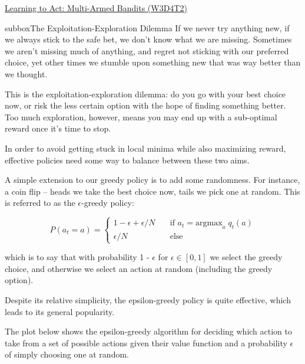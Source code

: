 \begin{textbox}{\href{https://compneuro.neuromatch.io/tutorials/W3D4_ReinforcementLearning/student/W3D4_Tutorial2.html}{Learning to Act: Multi-Armed Bandits (W3D4T2)} }

\begin{subbox}{subbox}{The Exploitation-Exploration Dilemma}
\scriptsize
If we never try anything new, if we always stick to the safe bet, we don't know what we are missing. Sometimes we aren't missing much of anything, and regret not sticking with our preferred choice, yet other times we stumble upon something new that was way better than we thought.

This is the exploitation-exploration dilemma: do you go with your best choice now, or risk the less certain option with the hope of finding something better. Too much exploration, however, means you may end up with a sub-optimal reward once it's time to stop.

In order to avoid getting stuck in local minima while also maximizing reward, effective policies need some way to balance between these two aims.

A simple extension to our greedy policy is to add some randomness. For instance, a coin flip -- heads we take the best choice now, tails we pick one at random. This is referred to as the $\epsilon$-greedy policy:

\begin{equation}
P (a_{t} = a) = 
        \begin{cases}
        1 - \epsilon + \epsilon/N    & \quad \text{if } a_{t} = \text{argmax}_{a} \; q_{t} (a) \\
        \epsilon/N        & \quad \text{else} 
        \end{cases} 
\end{equation}

which is to say that with probability 1 - $\epsilon$ for $\epsilon \in [0,1]$ we select the greedy choice, and otherwise we select an action at random (including the greedy option).

Despite its relative simplicity, the epsilon-greedy policy is quite effective, which leads to its general popularity.

The plot below shows the epsilon-greedy algorithm for deciding which action to take from a set of possible actions given their value function and a probability $\epsilon$ of simply choosing one at random. 
\begin{center}
    

\end{center}
\end{subbox}
\end{textbox}
